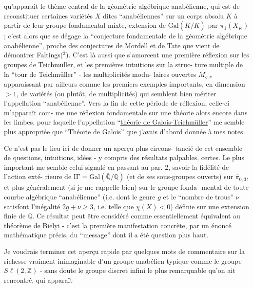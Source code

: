 
qu'apparaît le thème central de la géométrie algébrique anabélienne,
qui est de reconstituer certaines variétés $X$ dites ``anabéliennes''
sur un corps absolu $K$ à partir de leur groupe fondamental mixte,
extension de $\mathrm{Gal}(\bar{K}/K)$ par $\pi_1(X_{\bar{K}})$ ; c'est alors que se dégage la
``conjecture fondamentale de la géométrie algébrique anabélienne'',
proche des conjectures de Mordell et de Tate que vient de démontrer
Faltings($^3$). C'est là aussi que s'amorcent une première réflexion sur
les groupes de Teichmüller, et les premières intuitions sur la struc-%
ture multiple de la ``tour de Teichmüller'' - les multiplicités modu-%
laires ouvertes $M_{g,\nu}$ apparaissant par ailleurs comme les premiers
exemples importants, en dimension $> 1$, de variétés (ou plutôt, de
multiplicités) qui semblent bien mériter l'appellation ``anabélienne''.
Vers la fin de cette période de réflexion, celle-ci m'apparaît com-%
me une réflexion fondamentale sur une théorie alors encore dans les
limbes, pour laquelle l'appellation ``\uline{théorie de Galois-Teichmüller}''
me semble plus appropriée que ``Théorie de Galois'' que j'avais d'abord
donnée à mes notes.

Ce n'est pas le lieu ici de donner un aperçu plus circons-%
tancié de cet ensemble de questions, intuitions, idées - y compris
des résultats palpables, certes. Le plus important me semble celui
signalé en passant au par. 2, savoir la fidélité de l'action exté-%
rieure de $\mathrm{I\Gamma} = \mathrm{Gal}(\bar{\mathbb{Q}}/\mathbb{Q})$ (et de ses sous-groupes ouverts) sur $\hat{\pi}_{0,3}$,
et plus généralement (si je me rappelle bien) sur le groupe fonda-%
mental de toute courbe algébrique ``anabélienne'' (i.e. dont le genre
$g$ et le ``nombre de trous'' $\nu$ satisfont l'inégalité $2g + \nu \geq 3$,
i.e. telle que $\chi(X) < 0$) définie sur une extension finie de $\mathbb{Q}$. Ce
résultat peut être considéré comme essentiellement équivalent au
théorème de Bielyi - c'est la première manifestation concrète, par
un énoncé mathématique précis, du ``message'' dont il a été question
plus haut.

Je voudrais terminer cet aperçu rapide par quelques mots
de commentaire sur la richesse vraiment inimaginable d'un groupe
anabélien typique comme le groupe $S\ell(2,\mathbb{Z})$ - sans doute le groupe
discret infini le plus remarquable qu'on ait rencontré, qui apparaît

